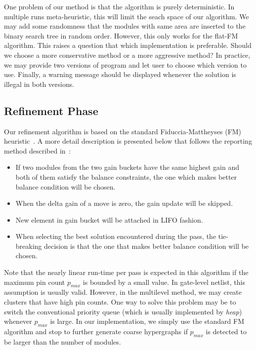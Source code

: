 \documentclass[journal]{IEEEtran}
\begin{document}
One problem of our method is that the algorithm is purely
deterministic. In multiple runs meta-heuristic, this will limit the
seach space of our algorithm. We may add some randomness that the
modules with same 
area are inserted to the binary search tree in random order. However,
this only works for the flat-FM algorithm. This raises a question that
which implementation is preferable. Should we choose a more
conservative method or a more aggressive method? In practice, we may
provide two versions of program and let user to choose which version to
use. Finally, a warning message should be displayed whenever the
solution is illegal in both versions.

\subsection{Refinement Phase}
\label{refinement}
Our refinement algorithm is based on the standard Fiduccia-Mattheyses
(FM) heuristic~\cite{FM_1982}. A more detail description is presented
below that follows the reporting method described
in~\cite{hypergraph_reporting_1999}: 

\begin{itemize}
\item 
If two modules from the two gain buckets have the same highest gain and
both of them satisfy the balance constraints, the one which makes better
balance condition will be chosen.
\item
When the delta gain of a move is zero, the gain update will be skipped.
\item
New element in gain bucket will be attached in LIFO fashion.
\item
When selecting the best solution encountered during the pass, the
tie-breaking decision is that the one that makes better balance
condition will be chosen.
\end{itemize}

Note that the nearly linear run-time per pass is expected in this
algorithm if the maximum pin count $p_{max}$ is bounded by a small
value. In gate-level netlist, this assumption is usually
valid. However, in the multilevel method, we may 
create clusters that have high pin counts.
One way to solve this problem may be to switch the conventional priority
queue (which is usually implemented by {\it heap}) whenever $p_{max}$
is large. In our implementation, we simply use the standard FM
algorithm and stop to further generate coarse hypergraphs if $p_{max}$
is detected to be larger than the number of modules.
\end{document}
